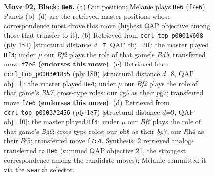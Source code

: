 \documentclass[11pt]{article}
\begin{document}
\clearpage

\begin{figure}[p]\centering
\begin{subfigure}{0.46\textwidth}\centering
\resizebox{\linewidth}{!}{%
\newchessgame
\chessboard[
  setfen={5R2/3k1b2/1P6/6R1/7r/5K2/8/8 b - - 4 92},
  showmover=false,
  pgfstyle=straightmove, color=movearrow, markmove={f7-e6}
]}
\caption{}
\end{subfigure}\hfill
\begin{subfigure}{0.46\textwidth}\centering
\resizebox{\linewidth}{!}{%
\newchessgame
\chessboard[
  setfen={8/8/p5R1/3Br3/8/7k/5K2/8 w - - 14 93},
  showmover=false,
  pgfstyle=straightmove, color=movearrow, markmove={d5-f3}
]}
\caption{}
\end{subfigure}
\\[4pt]
\begin{subfigure}{0.46\textwidth}\centering
\resizebox{\linewidth}{!}{%
\newchessgame
\chessboard[
  setfen={8/3k2pB/R7/4K3/8/8/8/4r3 w - - 85 91},
  showmover=false,
  pgfstyle=straightmove, color=movearrow, markmove={h7-e4}
]}
\caption{}
\end{subfigure}\hfill
\begin{subfigure}{0.46\textwidth}\centering
\resizebox{\linewidth}{!}{%
\newchessgame
\chessboard[
  setfen={8/6B1/8/3k1b1K/8/6b1/8/6R1 b - - 64 94},
  showmover=false,
  pgfstyle=straightmove, color=movearrow, markmove={g3-f4}
]}
\caption{}
\end{subfigure}
\caption{\textbf{Move 92, Black: \texttt{Be6}.} (a) Our position; Melanie plays \texttt{Be6} (\texttt{f7e6}). Panels (b)--(d) are the retrieved master positions whose correspondence most drove this move (highest QAP objective among those that transfer to it). (b) Retrieved from \texttt{ccrl\_top\_p0001\#608} (ply 184) [structural distance $d$=7, QAP obj=20]: the master played \texttt{Bf3}; under $\mu$ our \emph{Bf2} plays the role of that game's \emph{Bd5}; transferred move \texttt{f7e6} \textbf{(endorses this move)}. (c) Retrieved from \texttt{ccrl\_top\_p0003\#1855} (ply 180) [structural distance $d$=8, QAP obj=1]: the master played \texttt{Be4}; under $\mu$ our \emph{Bf2} plays the role of that game's \emph{Bh7}; cross-type roles: our \emph{r}g5 as their \emph{p}g7; transferred move \texttt{f7e6} \textbf{(endorses this move)}. (d) Retrieved from \texttt{ccrl\_top\_p0003\#2456} (ply 187) [structural distance $d$=9, QAP obj=10]: the master played \texttt{Bf4}; under $\mu$ our \emph{Bf2} plays the role of that game's \emph{Bg6}; cross-type roles: our \emph{p}b6 as their \emph{b}g7, our \emph{R}h4 as their \emph{B}f5; transferred move \texttt{f7c4}. Synthesis: 2 retrieved analogs transferred to \texttt{Be6} (summed QAP objective 21, the strongest correspondence among the candidate moves); Melanie committed it via the \texttt{search} selector.}
\label{fig:thought-m183}
\end{figure}
\end{document}
